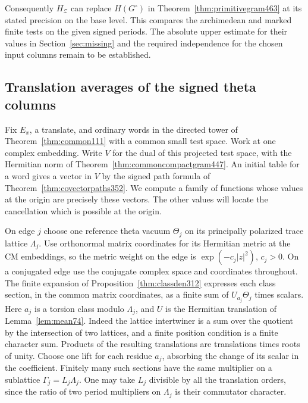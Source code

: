 \documentclass[a4paper,11pt]{article}
\theoremstyle{definition}
\theoremstyle{remark}
\numberwithin{equation}{section}
\begin{document}
Consequently \(H_{\mathcal Z}\) can replace \(H(G^\circ)\) in
Theorem~\ref{thm:primitivegram463} at its stated precision on the
base level. This compares the archimedean and marked finite tests
on the given signed periods. The absolute upper estimate for
their values in Section~\ref{sec:missing} and the required
independence for the chosen input columns remain to be established.


\subsection{Translation averages of the signed theta columns}
\label{sec:signedcovariance478}

Fix \(E_x\), a translate, and ordinary words in the directed tower of
Theorem~\ref{thm:common111} with a common small test space.
Work at one complex embedding. Write \(V\) for the dual of this
projected test space, with the Hermitian norm of
Theorem~\ref{thm:commoncompactgram447}. An initial table for a word
gives a vector in \(V\) by the signed path formula of
Theorem~\ref{thm:covectorpaths352}. We compute a family of functions
whose values at the origin are precisely these vectors. The other
values will locate the cancellation which is possible at the origin.

On edge \(j\) choose one reference theta vacuum \(\Theta_j\) on its
principally polarized trace lattice \(\Lambda_j\).
Use orthonormal matrix coordinates for its Hermitian metric at the
CM embeddings, so the metric weight on the edge is
\(\exp(-c_j|z|^2)\), \(c_j>0\). On a conjugated edge use the
conjugate complex space and coordinates throughout. The finite
expansion of Proposition~\ref{thm:classden312} expresses each
class section, in the common matrix coordinates, as a finite sum
of \(U_{a_j}\Theta_j\) times scalars. Here \(a_j\) is a torsion
class modulo \(\Lambda_j\), and \(U\) is the Hermitian translation
of Lemma~\ref{lem:mean74}. Indeed the lattice intertwiner is a
sum over the quotient by the intersection of two lattices, and a
finite position condition is a finite character sum. Products
of the resulting translations are translations times roots of
unity. Choose one lift for each residue \(a_j\), absorbing the
change of its scalar in the coefficient. Finitely many such
sections have the same multiplier on a sublattice
\(\Gamma_j=L_j\Lambda_j\). One may take \(L_j\) divisible by
all the translation orders, since the ratio of two period
multipliers on \(\Lambda_j\) is their commutator character.
\end{document}
